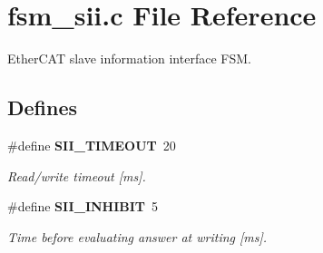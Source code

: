 \section{fsm\-\_\-sii.\-c \-File \-Reference}
\label{fsm__sii_8c}


\-Ether\-C\-A\-T slave information interface \-F\-S\-M.  


\subsection*{\-Defines}
\begin{DoxyCompactItemize}
\item 
\#define {\bf \-S\-I\-I\-\_\-\-T\-I\-M\-E\-O\-U\-T}~20
\begin{DoxyCompactList}\small\item\em \-Read/write timeout [ms]. \end{DoxyCompactList}\item 
\#define {\bf \-S\-I\-I\-\_\-\-I\-N\-H\-I\-B\-I\-T}~5\label{fsm__sii_8c_aaf562911fbe9d8d473390f97c2a185e1}

\begin{DoxyCompactList}\small\item\em \-Time before evaluating answer at writing [ms]. \end{DoxyCompactList}\end{DoxyCompactItemize}
